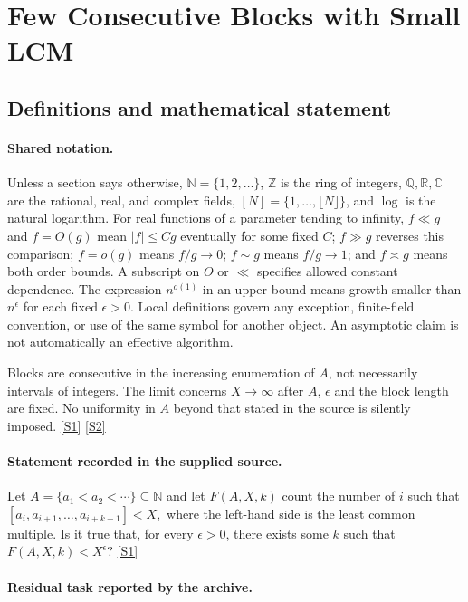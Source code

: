 \documentclass[11pt,a4paper]{article}
\newcommand{\N}{\mathbb{N}}
\newcommand{\Z}{\mathbb{Z}}
\newcommand{\Q}{\mathbb{Q}}
\newcommand{\R}{\mathbb{R}}
\newcommand{\C}{\mathbb{C}}
\newcommand{\sref}[2]{\hyperlink{source:#1:#2}{[S#2]}}
\begin{document}
\section{Few Consecutive Blocks with Small LCM}\label{statement}


\subsection{Definitions and mathematical statement}

\paragraph{Shared notation.}Unless a section says otherwise, $\N=\{1,2,\ldots\}$,
$\Z$ is the ring of integers, $\Q,\R,\C$ are the rational, real, and complex
fields, $[N]=\{1,\ldots,\lfloor N\rfloor\}$, and $\log$ is the natural
logarithm. For real functions of a parameter tending to infinity,
$f\ll g$ and $f=O(g)$ mean $|f|\leq Cg$ eventually for some fixed $C$;
$f\gg g$ reverses this comparison; $f=o(g)$ means $f/g\to0$;
$f\sim g$ means $f/g\to1$; and $f\asymp g$ means both order bounds.
A subscript on $O$ or $\ll$ specifies allowed constant dependence.
The expression $n^{o(1)}$ in an upper bound means growth smaller than
$n^\epsilon$ for each fixed $\epsilon>0$. Local definitions govern any
exception, finite-field convention, or use of the same symbol for another
object. An asymptotic claim is not automatically an effective algorithm.



Blocks are consecutive in the increasing enumeration of $A$, not necessarily intervals of integers. The limit concerns $X\to\infty$ after $A$, $\epsilon$ and the block length are fixed. No uniformity in $A$ beyond that stated in the source is silently imposed. \sref{statement}{1} \sref{statement}{2}

\paragraph{Statement recorded in the supplied source.}
Let $A=\{a_1<a_2<\cdots\}\subseteq \mathbb{N}$ and let $F(A,X,k)$ count the number of $i$ such that $ [a_i,a_{i+1},\ldots,a_{i+k-1}] < X, $ where the left-hand side is the least common multiple. Is it true that, for every $\epsilon >0$, there exists some $k$ such that $ F(A,X,k)<X^\epsilon? $ \sref{statement}{1}

\paragraph{Residual task reported by the archive.}
\end{document}
